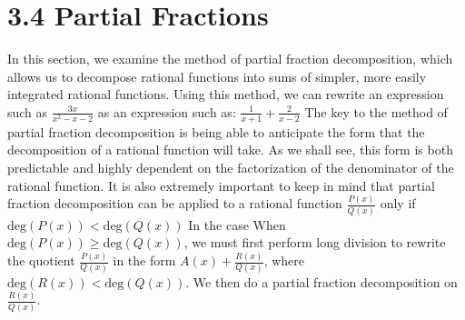 \documentclass{report}
\begin{document}
    \section*{3.4 Partial Fractions}
    \bigbreak \noindent 
    In this section, we examine the method of partial fraction decomposition, which allows us to decompose rational functions into sums of simpler, more easily integrated rational functions. Using this method, we can rewrite an expression such as $\frac{3x}{x^2 - x - 2}$
    as an expression such as: $\frac{1}{x+1} + \frac{2}{x-2}$
    \bigbreak \noindent 
    The key to the method of partial fraction decomposition is being able to anticipate the form that the decomposition of a rational function will take. As we shall see, this form is both predictable and highly dependent on the factorization of the denominator of the rational function. It is also extremely important to keep in mind that partial fraction decomposition can be applied to a rational function $ \frac{P(x)}{Q(x)} $ only if $\text{deg}(P(x)) < \text{deg}(Q(x))$ In the case
    When $\text{deg}(P(x)) \geq \text{deg}(Q(x))$, we must first perform long division to rewrite the quotient $\frac{P(x)}{Q(x)}$ in the form $A(x) + \frac{R(x)}{Q(x)}$, where $\text{deg}(R(x)) < \text{deg}(Q(x))$. We then do a partial fraction decomposition on $\frac{R(x)}{Q(x)}$. 

    \bigbreak \noindent 
\end{document}
